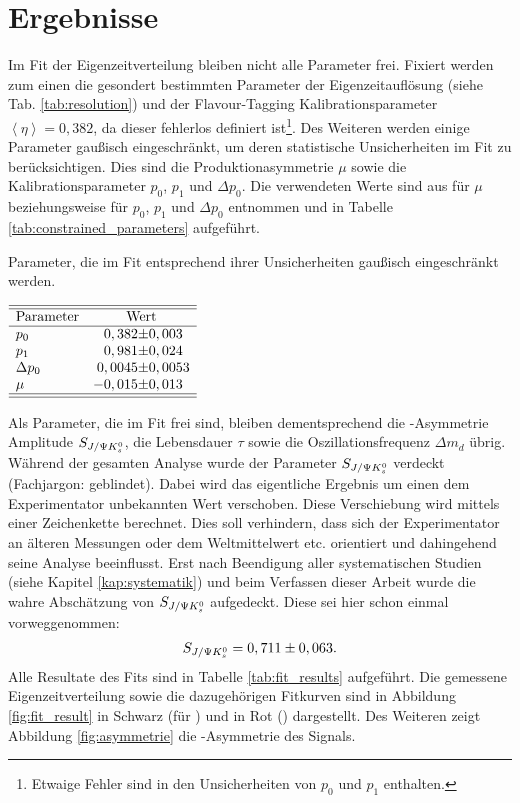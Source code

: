 \section{Ergebnisse} \label{kap:fitergebnis}
Im Fit der Eigenzeitverteilung bleiben nicht alle Parameter frei. Fixiert werden zum einen die gesondert bestimmten Parameter der Eigenzeitauflösung (siehe Tab. \ref{tab:resolution}) und der Flavour-Tagging Kalibrationsparameter $\left\langle\eta\right\rangle = 0,382$, da dieser fehlerlos definiert ist\footnote{Etwaige Fehler sind in den Unsicherheiten von $p_0$ und $p_1$ enthalten.}. Des Weiteren werden einige Parameter gaußisch eingeschränkt, um deren statistische Unsicherheiten im Fit zu berücksichtigen. Dies sind die Produktionasymmetrie $\mu$ sowie die Kalibrationsparameter $p_0$, $p_1$ und $\Delta p_0$. Die verwendeten Werte sind aus \cite{lhcb-paper} für $\mu$ beziehungsweise \cite{tagging} für $p_0$, $p_1$ und $\Delta p_0$ entnommen und in Tabelle \ref{tab:constrained_parameters} aufgeführt.
\begin{table}[hptb]
\centering
\caption{Parameter, die im Fit entsprechend ihrer Unsicherheiten gaußisch eingeschränkt werden.}
\label{tab:constrained_parameters}
$\begin{array}{l r@{\pm}l }
\hline 
\hline
\text{Parameter} & \multicolumn{2}{c}{\text{Wert}}\\
\hline
p_0 & 0,382 & 0,003 \\
p_1 & 0,981 & 0,024 \\
\Delta p_0 & 0,0045 & 0,0053 \\
\mu & -0,015 & 0,013 \\ \hline \hline
\end{array}$ 
\end{table}
Als Parameter, die im Fit frei sind, bleiben dementsprechend die \CP-Asymmetrie Amplitude $S_{J/\Psi K_s^0}$, die Lebensdauer $\tau$ sowie die Oszillationsfrequenz $\Delta m_d$ übrig. Während der gesamten Analyse wurde der Parameter $S_{J/\Psi K_s^0}$ verdeckt (Fachjargon: \glqq geblindet\grqq). Dabei wird das eigentliche Ergebnis um einen dem Experimentator unbekannten Wert verschoben. Diese Verschiebung wird mittels einer Zeichenkette berechnet. Dies soll verhindern, dass sich der Experimentator an älteren Messungen oder dem Weltmittelwert etc. orientiert und dahingehend seine Analyse beeinflusst. Erst nach Beendigung aller systematischen Studien (siehe Kapitel \ref{kap:systematik}) und beim Verfassen dieser Arbeit wurde die wahre Abschätzung von $S_{J/\Psi K_s^0}$ aufgedeckt. Diese sei hier schon einmal vorweggenommen:
\begin{align}
S_{J/\Psi K_s^0} = 0,711 \pm 0,063.     \label{eq:fit_result}
\end{align}
Alle Resultate des Fits sind in Tabelle \ref{tab:fit_results} aufgeführt. Die gemessene Eigenzeitverteilung sowie die dazugehörigen Fitkurven sind in Abbildung \ref{fig:fit_result} in Schwarz (für \Bd) und in Rot (\Bdbar) dargestellt. Des Weiteren zeigt Abbildung \ref{fig:asymmetrie} die \CP-Asymmetrie des Signals.


